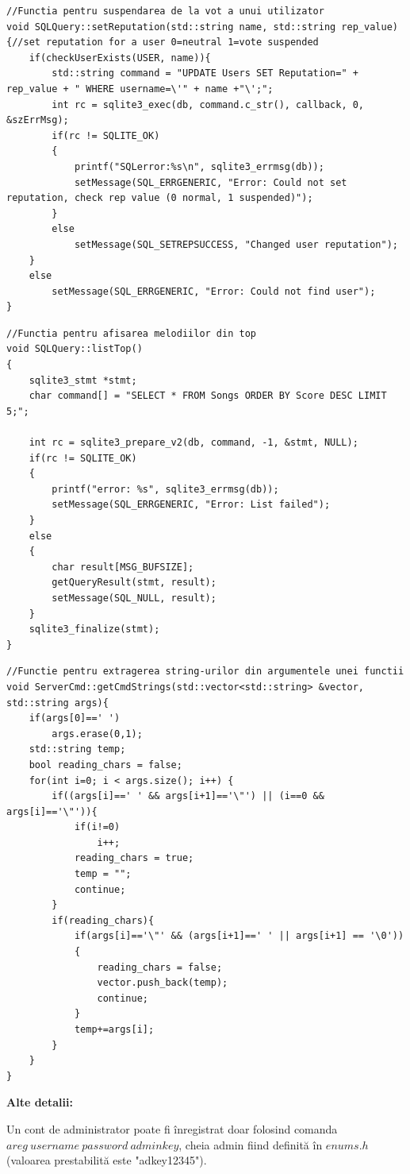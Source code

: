 \documentclass{article}
\begin{document}
\begin{lstlisting}
//Functia pentru suspendarea de la vot a unui utilizator
void SQLQuery::setReputation(std::string name, std::string rep_value)
{//set reputation for a user 0=neutral 1=vote suspended
    if(checkUserExists(USER, name)){
        std::string command = "UPDATE Users SET Reputation=" + rep_value + " WHERE username=\'" + name +"\';";
        int rc = sqlite3_exec(db, command.c_str(), callback, 0, &szErrMsg);
        if(rc != SQLITE_OK)
        {
            printf("SQLerror:%s\n", sqlite3_errmsg(db));
            setMessage(SQL_ERRGENERIC, "Error: Could not set reputation, check rep value (0 normal, 1 suspended)");
        }
        else
            setMessage(SQL_SETREPSUCCESS, "Changed user reputation"); 
    }
    else
        setMessage(SQL_ERRGENERIC, "Error: Could not find user");
}
\end{lstlisting}
\pagebreak
\begin{lstlisting}
//Functia pentru afisarea melodiilor din top
void SQLQuery::listTop()
{
    sqlite3_stmt *stmt;
    char command[] = "SELECT * FROM Songs ORDER BY Score DESC LIMIT 5;";
    
    int rc = sqlite3_prepare_v2(db, command, -1, &stmt, NULL);
    if(rc != SQLITE_OK)
    {
        printf("error: %s", sqlite3_errmsg(db));
        setMessage(SQL_ERRGENERIC, "Error: List failed");
    }
    else
    {
        char result[MSG_BUFSIZE];
        getQueryResult(stmt, result);
        setMessage(SQL_NULL, result);
    }
    sqlite3_finalize(stmt);
}
\end{lstlisting}
\begin{lstlisting}
//Functie pentru extragerea string-urilor din argumentele unei functii
void ServerCmd::getCmdStrings(std::vector<std::string> &vector, std::string args){
    if(args[0]==' ')
        args.erase(0,1);
    std::string temp;
    bool reading_chars = false;
    for(int i=0; i < args.size(); i++) {
        if((args[i]==' ' && args[i+1]=='\"') || (i==0 && args[i]=='\"')){
            if(i!=0)
                i++;
            reading_chars = true;
            temp = "";
            continue;
        }
        if(reading_chars){
            if(args[i]=='\"' && (args[i+1]==' ' || args[i+1] == '\0'))
            {
                reading_chars = false;
                vector.push_back(temp);
                continue;
            }
            temp+=args[i];
        }
    }
}
\end{lstlisting}
\pagebreak
\textbf{Alte detalii:}

Un cont de administrator poate fi înregistrat doar folosind comanda \linebreak $areg\ username\ password\ adminkey$, cheia admin fiind definită în $enums.h$\linebreak(valoarea prestabilită este "adkey12345").
\end{document}
